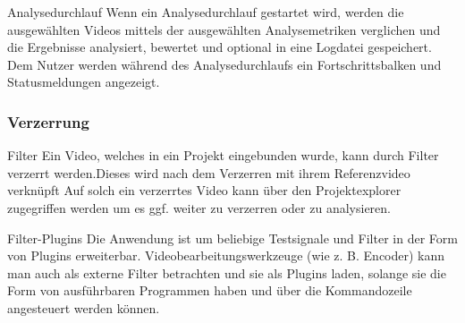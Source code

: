 %




 Analysedurchlauf
\newline
Wenn ein Analysedurchlauf gestartet wird, werden die ausgewählten Videos mittels der ausgewählten
 Analysemetriken verglichen und die Ergebnisse analysiert, bewertet und optional in eine Logdatei
  gespeichert. Dem Nutzer werden während des Analysedurchlaufs ein Fortschrittsbalken und Statusmeldungen
   angezeigt. 

\subsubsection{Verzerrung}
 Filter
\newline
Ein Video, welches in ein Projekt eingebunden wurde, kann durch Filter verzerrt werden.Dieses wird
nach dem Verzerren mit ihrem Referenzvideo verknüpft  Auf solch ein verzerrtes Video kann über den Projektexplorer zugegriffen werden um es ggf. weiter zu verzerren oder zu analysieren.


 Filter-Plugins
\newline
Die Anwendung ist um beliebige Testsignale und Filter in der Form von Plugins erweiterbar.
 Videobearbeitungswerkzeuge (wie z. B. Encoder) kann man auch als externe Filter betrachten und sie als
  Plugins laden, solange sie die Form von ausführbaren Programmen haben und über die Kommandozeile 
angesteuert werden können.

